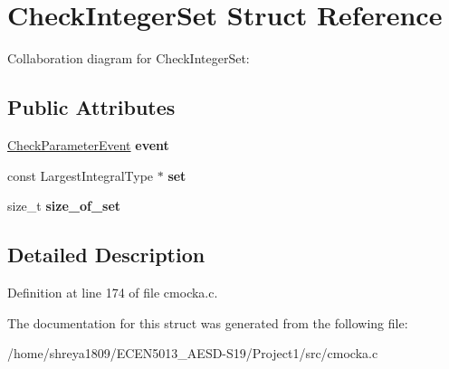 \hypertarget{structCheckIntegerSet}{}\section{Check\+Integer\+Set Struct Reference}
\label{structCheckIntegerSet}


Collaboration diagram for Check\+Integer\+Set\+:
\subsection*{Public Attributes}
\begin{DoxyCompactItemize}
\item 
\mbox{\label{structCheckIntegerSet_a7153dfb1ec04c0fcacfeb2d60321d4fd}} 
\hyperlink{structCheckParameterEvent}{Check\+Parameter\+Event} {\bfseries event}
\item 
\mbox{\label{structCheckIntegerSet_a9bb5e12093c709bc42788033506c1c2a}} 
const Largest\+Integral\+Type $\ast$ {\bfseries set}
\item 
\mbox{\label{structCheckIntegerSet_a82dbcbeea43de48060c86d89c6ccc444}} 
size\+\_\+t {\bfseries size\+\_\+of\+\_\+set}
\end{DoxyCompactItemize}


\subsection{Detailed Description}


Definition at line 174 of file cmocka.\+c.



The documentation for this struct was generated from the following file\+:\begin{DoxyCompactItemize}
\item 
/home/shreya1809/\+E\+C\+E\+N5013\+\_\+\+A\+E\+S\+D-\/\+S19/\+Project1/src/cmocka.\+c\end{DoxyCompactItemize}
